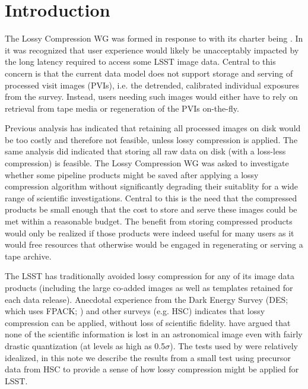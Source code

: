 
\section{Introduction}

The Lossy Compression WG was formed in response to  with its charter
being .  In  it was recognized that user 
experience would likely be unacceptably impacted by the long latency required to 
access some LSST image data.  Central to this concern is that the current data model 
does not support storage and serving of processed visit images (PVIs), i.e. the 
detrended, calibrated individual exposures from the survey.  Instead, users needing
such images would either have to rely on retrieval from tape media or regeneration
of the PVIs on-the-fly.

Previous analysis has indicated that retaining all processed images on disk would 
be too costly and therefore not feasible, unless lossy compression is applied. 
The same analysis did indicated that storing all raw data on disk (with a loss-less 
compression) is feasible.  The Lossy Compression WG was asked to investigate whether 
some pipeline products might be saved after applying a lossy compression algorithm 
without significantly degrading their suitablity for a wide range of scientific 
investigations.  Central to this is the need that the compressed products be small 
enough that the cost to store and serve these images could be met within a reasonable 
budget.  The benefit from storing compressed products would only be realized if those 
products were indeed useful for many users as it would free resources that otherwise
would be engaged in regenerating or serving a tape archive.

The LSST has traditionally avoided lossy compression for any of its image data products 
(including the large co-added images as well as templates retained for each data release). 
Anecdotal experience from the Dark Energy Survey (DES; which uses FPACK; \citet{PSW2009}) 
and other surveys (e.g. HSC) indicates that lossy compression can be applied, without 
loss of scientific fidelity.  \citet{PWH2010} have argued that none of the scientific 
information is lost in an astronomical image even with fairly drastic quantization 
(at levels as high as 0.5$\sigma$).  The tests used by \citet{PWH2010} were relatively 
idealized, in this note we describe the results from a small test using precursor data 
from HSC to provide a sense of how lossy compression might be applied for LSST.



